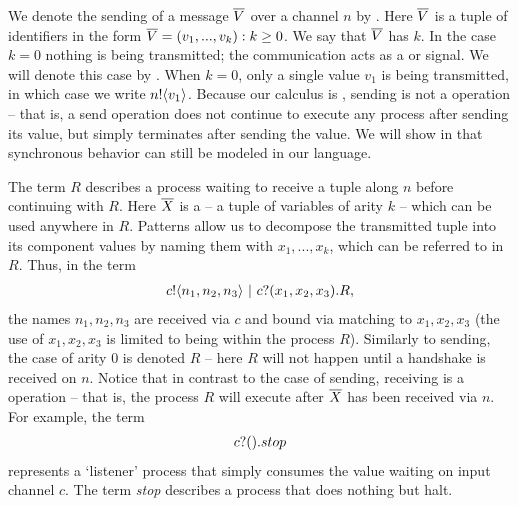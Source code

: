 	We denote the sending of a message $\overline{V}$ over a channel $n$ by .  Here $\overline{V}$ is a tuple of identifiers in the form $\overline{V}=(v_1,...,v_k):k\geq 0$.  We say that $\overline{V}$ has  $k$.  In the case $k=0$ nothing is being transmitted; the communication acts as a  or signal.  We will denote this case by .  When $k=0$, only a single value $v_1$ is being transmitted, in which case we write ${n}!\langle{v_1}\rangle$.  Because our calculus is , sending is not a  operation -- that is, a send operation does not continue to execute any process after sending its value, but simply terminates after sending the value.  We will show in  that synchronous behavior can still be modeled in our language.
	
	The term $R$ describes a process waiting to receive a tuple along $n$ before continuing with $R$.  Here $\overline{X}$ is a  -- a tuple of variables of arity $k$ -- which can be used anywhere in $R$.  Patterns allow us to decompose the transmitted tuple into its component values by naming them with $x_1,...,x_k$, which can be referred to in $R$.  Thus, in the term
	\begin{align}
		{c}!\langle{n_1,n_2,n_3}\rangle \ |\  {c}?({x_1,x_2,x_3}). R,
	\end{align}
the names $n_1,n_2,n_3$ are received via $c$ and bound via matching to $x_1,x_2,x_3$ (the use of $x_1,x_2,x_3$ is limited to being within the process $R$).  Similarly to sending, the case of arity 0 is denoted $R$ -- here $R$ will not happen until a handshake is received on $n$.  Notice that in contrast to the case of sending, receiving is a  operation -- that is, the process $R$ will execute after $\overline{X}$ has been received via $n$.  For example, the term
\begin{align}
	{c}?({}).stop
\end{align}
represents a `listener'	process that simply consumes the value waiting on input channel $c$.  The term \emph{stop} describes a process that does nothing but halt.

